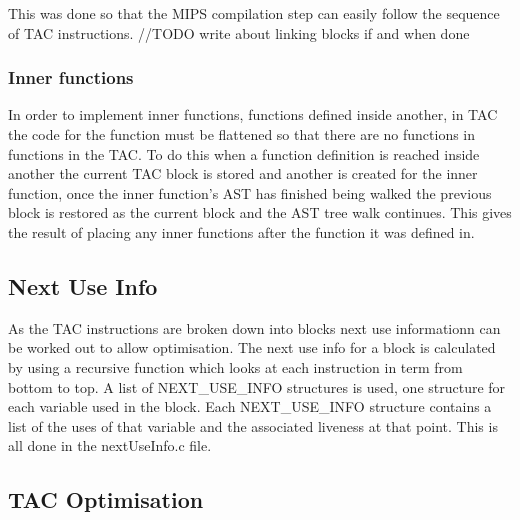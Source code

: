 \documentclass{article}
\begin{document}
\begin{center}
\end{center}

This was done so that the MIPS compilation step can easily follow the sequence of
TAC instructions. //TODO write about linking blocks if and when done

\subsubsection{Inner functions}

In order to implement inner functions, functions defined inside another, in TAC
the code for the function must be flattened so that there are no functions in functions
in the TAC. To do this when a function definition is reached inside another the current
TAC block is stored and another is created for the inner function, once the inner function's
AST has finished being walked the previous block is restored as the current block and
the AST tree walk continues. This gives the result of placing any inner functions after
the function it was defined in.

\subsection{Next Use Info}

As the TAC instructions are broken down into blocks next use informationn can be
worked out to allow optimisation. The next use info for a block is calculated by
using a recursive function which looks at each instruction in term from bottom
to top. A list of NEXT_USE_INFO structures is used, one structure for each variable
used in the block. Each NEXT_USE_INFO structure contains a list of the uses of that
variable and the associated liveness at that point. This is all done in the nextUseInfo.c file.

\subsection{TAC Optimisation}
\end{document}
